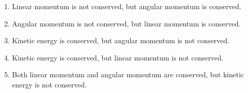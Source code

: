\documentclass{../../../oss-classkick}
\begin{document}
\begin{multicols*}{2}
\begin{enumerate}[leftmargin=18pt]
\begin{center}
    \end{center}
    \begin{enumerate}[nosep,leftmargin=18pt,label=(\Alph*)]
    \item Linear momentum is not conserved, but angular momentum is conserved.
    \item Angular momentum is not conserved, but linear momentum is conserved.
    \item Kinetic energy is conserved, but angular momentum is not conserved.
    \item Kinetic energy is conserved, but linear momentum is not conserved.
    \item Both linear momentum and angular momentum are conserved, but kinetic
      energy is not conserved.
    \end{enumerate}
    \vspace{.7in}
    

\end{enumerate}
\end{multicols*}
\end{document}
